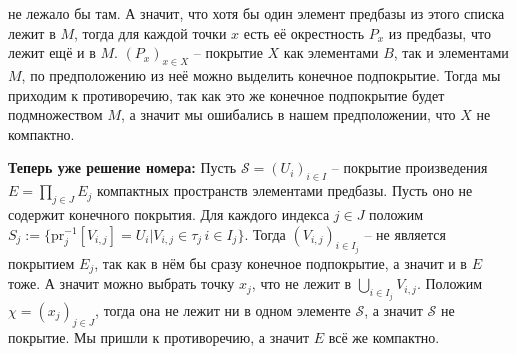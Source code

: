 \documentclass{article}
\begin{document}
\begin{enumerate}
        не лежало бы там. А значит, что хотя бы один элемент предбазы из этого
        списка лежит в $M$, тогда для каждой точки $x$ есть её окрестность
        $P_x$ из предбазы, что лежит ещё и в $M$. $(P_x)_{x\in X}$ – покрытие
        $X$ как элементами $B$, так и элементами $M$, по предположению из неё
        можно выделить конечное подпокрытие. Тогда мы приходим к противоречию,
        так как это же конечное подпокрытие будет подмножеством $M$, а значит
        мы ошибались в нашем предположении, что $X$ не компактно.\par
        \textbf{Теперь уже решение номера:} Пусть $\mathcal{S}=(U_i)_{i\in I}$
        – покрытие
        произведения $E=\prod_{j\in J}E_j$ компактных пространств элементами
        предбазы. Пусть оно не содержит конечного покрытия. Для каждого
        индекса $j\in J$ положим $S_j:=\{\text{pr}_j^{-1}[V_{i,j}]=U_i|V_{i,j}
        \in\tau_j\,i\in I_j\}$. Тогда $(V_{i,j})_{i\in I_j}$ – не является
        покрытием $E_j$, так как в нём бы сразу конечное подпокрытие, а значит
        и в $E$ тоже. А значит можно выбрать точку $x_j$, что не лежит
        в $\bigcup_{i\in I_j}V_{i,j}$. Положим $\chi=(x_j)_{j\in J}$, тогда она
        не лежит ни в одном элементе $\mathcal{S}$, а значит $\mathcal{S}$ не
        покрытие. Мы пришли к противоречию, а значит $E$ всё же компактно.


\end{enumerate}
\end{document}
